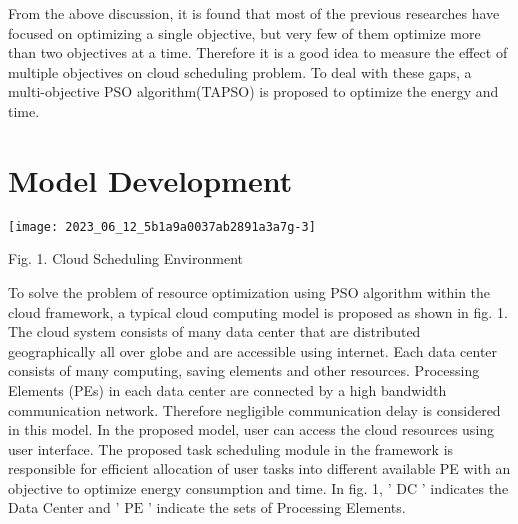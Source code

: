 \documentclass[10pt]{article}
\begin{document}
From the above discussion, it is found that most of the previous researches have focused on optimizing a single objective, but very few of them optimize more than two objectives at a time. Therefore it is a good idea to measure the effect of multiple objectives on cloud scheduling problem. To deal with these gaps, a multi-objective PSO algorithm(TAPSO) is proposed to optimize the energy and time.

\section{Model Development}
\begin{center}
\texttt{[image: 2023\_06\_12\_5b1a9a0037ab2891a3a7g-3]}
\end{center}

Fig. 1. Cloud Scheduling Environment

To solve the problem of resource optimization using PSO algorithm within the cloud framework, a typical cloud computing model is proposed as shown in fig. 1. The cloud system consists of many data center that are distributed geographically all over globe and are accessible using internet. Each data center consists of many computing, saving elements and other resources. Processing Elements (PEs) in each data center are connected by a high bandwidth communication network. Therefore negligible communication delay is considered in this model. In the proposed model, user can access the cloud resources using user interface. The proposed task scheduling module in the framework is responsible for efficient allocation of user tasks into different available PE with an objective to optimize energy consumption and time. In fig. 1, ' $\mathrm{DC}$ ' indicates the Data Center and ' $\mathrm{PE}$ ' indicate the sets of Processing Elements.
\end{document}
